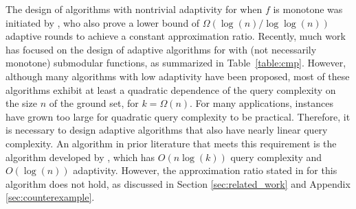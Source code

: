 The design of algorithms with nontrivial
adaptivity for \sm when $f$ is monotone 
was initiated by ,
who also prove a lower bound of $\Omega ( \log( n) / \log \log (n) ) $
adaptive rounds to achieve a constant approximation ratio. Recently, much
work has focused on the design of adaptive algorithms for \sm
with (not necessarily monotone) submodular functions,
as summarized in Table~\ref{table:cmp}.
However, although many algorithms with low adaptivity have been proposed,
most of these algorithms exhibit at least a quadratic dependence
of the query complexity on the size $n$ of the ground set, for $k = \Omega(n)$.
For many applications, instances have grown too large
for quadratic query complexity to be practical.
Therefore, it is necessary
to design adaptive algorithms that also have
nearly linear query complexity.
An algorithm in prior literature that
meets this requirement is the
algorithm developed by , which has $O(n \log (k))$
query complexity and $O( \log (n))$ adaptivity.
However, the 
approximation ratio stated in 
for this algorithm does not hold,
as discussed in Section \ref{sec:related_work} 
and Appendix \ref{sec:counterexample}.
